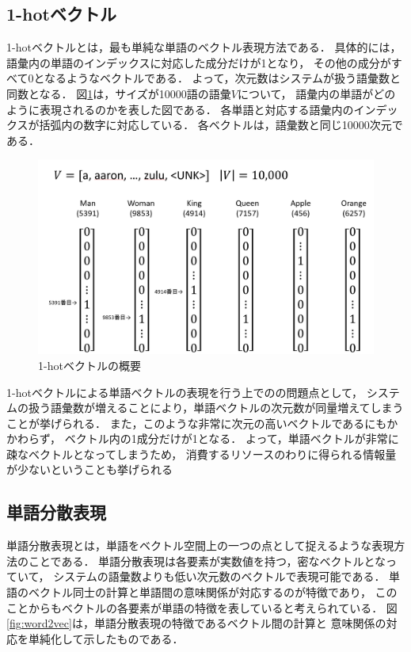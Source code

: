 	\subsection{1-hotベクトル}
		1-hotベクトルとは，最も単純な単語のベクトル表現方法である．
		具体的には，語彙内の単語のインデックスに対応した成分だけが1となり，
		その他の成分がすべて0となるようなベクトルである．
		よって，次元数はシステムが扱う語彙数と同数となる．
		図\ref{fig:one-hot-vector}は，サイズが10000語の語彙$V$について，
		語彙内の単語がどのように表現されるのかを表した図である．
		各単語と対応する語彙内のインデックスが括弧内の数字に対応している．
		各ベクトルは，語彙数と同じ10000次元である．
		\begin{figure}[H]
			\centering
			\includegraphics[width=\linewidth]{./figure/one-hot-vector.png}
			\caption{1-hotベクトルの概要}
			\label{fig:one-hot-vector}
		\end{figure}

		1-hotベクトルによる単語ベクトルの表現を行う上でのの問題点として，
		システムの扱う語彙数が増えることにより，単語ベクトルの次元数が同量増えてしまうことが挙げられる．
		また，このような非常に次元の高いベクトルであるにもかかわらず，
		ベクトル内の1成分だけが1となる．
		よって，単語ベクトルが非常に疎なベクトルとなってしまうため，
		消費するリソースのわりに得られる情報量が少ないということも挙げられる

	\subsection{単語分散表現}
		単語分散表現とは，単語をベクトル空間上の一つの点として捉えるような表現方法のことである．
		単語分散表現は各要素が実数値を持つ，密なベクトルとなっていて，
		システムの語彙数よりも低い次元数のベクトルで表現可能である．
		単語のベクトル同士の計算と単語間の意味関係が対応するのが特徴であり，
		このことからもベクトルの各要素が単語の特徴を表していると考えられている．
		図\ref{fig:word2vec}は，単語分散表現の特徴であるベクトル間の計算と
		意味関係の対応を単純化して示したものである．
		
